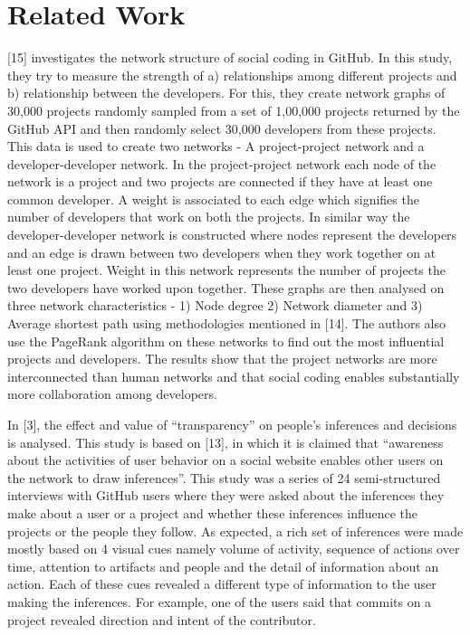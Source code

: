 
\section{Related Work}
\label{sec:related}

[15] investigates the network structure of social coding in GitHub. In this study, they try to measure the strength of a) relationships among different projects and b) relationship between the developers. For this, they create network graphs of 30,000 projects randomly sampled from a set of 1,00,000 projects returned by the GitHub API and then randomly select 30,000 developers from these projects. This data is used to create two networks - A project-project network and a developer-developer network. In the project-project network each node of the network is a project and two projects are connected if they have at least one common developer. A weight is associated to each edge which signifies the number of developers that work on both the projects. In similar way the developer-developer network is constructed where nodes represent the developers and an edge is drawn between two developers when they work together on at least one project. Weight in this network represents the number of projects the two developers have worked upon together. These graphs are then analysed on three network characteristics - 1) Node degree 2) Network diameter and 3) Average shortest path using methodologies mentioned in  [14]. The authors also use the PageRank algorithm on these networks to find out the most influential projects and developers. The results show that the project networks are more interconnected than human networks and that social coding enables substantially more collaboration among developers.

In [3], the effect and value of ``transparency'' on people's inferences and decisions is analysed. This study is based on [13], in which it is claimed that ``awareness about the activities of user behavior on a social website enables other users on the network to draw inferences''. This study was a series of 24 semi-structured interviews with GitHub users where they were asked about the inferences they make about a user or a project and whether these inferences influence the projects or the people they follow. As expected, a rich set of inferences were made mostly based on 4 visual cues namely volume of activity, sequence of actions over time, attention to artifacts and people and the detail of information about an action. Each of these cues revealed a different type of information to the user making the inferences. For example, one of the users said that commits on a project revealed direction and intent of the contributor.